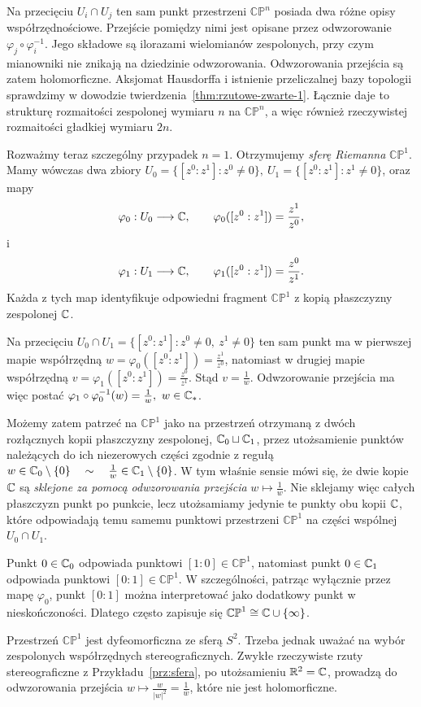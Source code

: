 \begin{przyklad}
Na przecięciu $U_i\cap U_j$ ten sam punkt przestrzeni
$\mathbb{CP}^n$ posiada dwa różne opisy współrzędnościowe.
Przejście pomiędzy nimi jest opisane przez odwzorowanie $\varphi_j\circ\varphi_i^{-1}$.
Jego składowe są ilorazami wielomianów zespolonych, przy czym
mianowniki nie znikają na dziedzinie odwzorowania. Odwzorowania
przejścia są zatem holomorficzne. Aksjomat Hausdorffa i istnienie
przeliczalnej bazy topologii sprawdzimy w dowodzie
twierdzenia~\ref{thm:rzutowe-zwarte-1}. Łącznie daje to strukturę
rozmaitości zespolonej wymiaru $n$ na $\mathbb{CP}^n$, a więc również
rzeczywistej rozmaitości gładkiej wymiaru $2n$.

Rozważmy teraz szczególny przypadek $n=1$. Otrzymujemy
\emph{sferę Riemanna} $\mathbb{CP}^1$.
Mamy wówczas dwa zbiory $U_0=\{[z^0:z^1]:z^0\neq0\}, \ U_1=\{[z^0:z^1]:z^1\neq0\}$,
oraz mapy
\[
\varphi_0:U_0\longrightarrow\mathbb{C},
\qquad
\varphi_0([z^0:z^1])=\frac{z^1}{z^0},
\]
i
\[
\varphi_1:U_1\longrightarrow\mathbb{C},
\qquad
\varphi_1([z^0:z^1])=\frac{z^0}{z^1}.
\]
Każda z tych map identyfikuje odpowiedni fragment
$\mathbb{CP}^1$ z kopią płaszczyzny zespolonej $\mathbb{C}$.

Na przecięciu $U_0\cap U_1 = \{[z^0:z^1]:z^0\neq0,\ z^1\neq0\}$
ten sam punkt ma w pierwszej mapie współrzędną $w = \varphi_0([z^0:z^1]) = \frac{z^1}{z^0}$,
natomiast w drugiej mapie współrzędną $v = \varphi_1([z^0:z^1]) = \frac{z^0}{z^1}$.
Stąd $v=\frac1w$.
Odwzorowanie przejścia ma więc postać $\varphi_1\circ\varphi_0^{-1}(w) = \frac1w, \ w\in\C_*$.

Możemy zatem patrzeć na $\mathbb{CP}^1$ jako na przestrzeń otrzymaną
z dwóch rozłącznych kopii płaszczyzny zespolonej, $\mathbb{C}_0\sqcup\mathbb{C}_1$,
przez utożsamienie punktów należących do ich niezerowych części zgodnie
z regułą $w\in\mathbb{C}_0\setminus\{0\} \quad\sim\quad \frac1w\in\mathbb{C}_1\setminus\{0\}$.
W tym właśnie sensie mówi się, że dwie kopie $\mathbb{C}$ są
\emph{sklejone za pomocą odwzorowania przejścia} $w\longmapsto\frac1w$.
Nie sklejamy więc całych płaszczyzn punkt po punkcie, lecz utożsamiamy
jedynie te punkty obu kopii $\mathbb{C}$, które odpowiadają temu samemu punktowi
przestrzeni $\mathbb{CP}^1$ na części wspólnej $U_0\cap U_1$.

Punkt $0\in\mathbb{C}_0$ odpowiada punktowi $[1:0]\in\mathbb{CP}^1$,
natomiast punkt $0\in\mathbb{C}_1$ odpowiada punktowi $[0:1]\in\mathbb{CP}^1$.
W szczególności, patrząc wyłącznie przez mapę $\varphi_0$, punkt
$[0:1]$ można interpretować jako dodatkowy punkt w nieskończoności.
Dlatego często zapisuje się $\mathbb{CP}^1 \cong \mathbb{C}\cup\{\infty\}$.

Przestrzeń $\mathbb{CP}^1$ jest dyfeomorficzna ze sferą $S^2$.
Trzeba jednak uważać na wybór zespolonych współrzędnych
stereograficznych. Zwykłe rzeczywiste rzuty stereograficzne z
Przykładu~\ref{prz:sfera}, po utożsamieniu $\mathbb{R}^2=\mathbb{C}$, prowadzą do
odwzorowania przejścia $w\longmapsto\frac{w}{|w|^2} = \frac1{\overline{w}}$,
które nie jest holomorficzne.


\end{przyklad}
